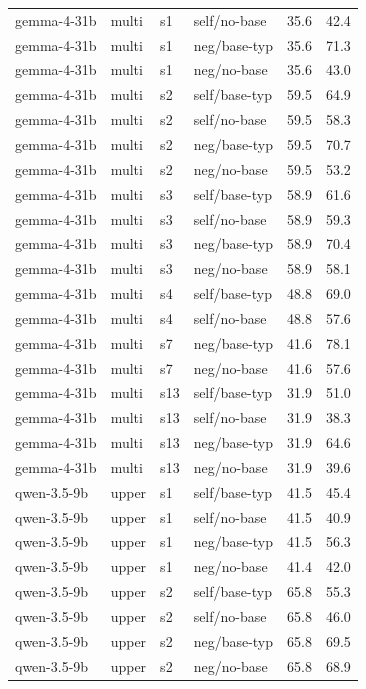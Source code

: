 {\begin{longtable}{llll rr}
gemma-4-31b & multi & s1 & self/no-base & 35.6 & 42.4 \\
gemma-4-31b & multi & s1 & neg/base-typ & 35.6 & 71.3 \\
gemma-4-31b & multi & s1 & neg/no-base & 35.6 & 43.0 \\
gemma-4-31b & multi & s2 & self/base-typ & 59.5 & 64.9 \\
gemma-4-31b & multi & s2 & self/no-base & 59.5 & 58.3 \\
gemma-4-31b & multi & s2 & neg/base-typ & 59.5 & 70.7 \\
gemma-4-31b & multi & s2 & neg/no-base & 59.5 & 53.2 \\
gemma-4-31b & multi & s3 & self/base-typ & 58.9 & 61.6 \\
gemma-4-31b & multi & s3 & self/no-base & 58.9 & 59.3 \\
gemma-4-31b & multi & s3 & neg/base-typ & 58.9 & 70.4 \\
gemma-4-31b & multi & s3 & neg/no-base & 58.9 & 58.1 \\
gemma-4-31b & multi & s4 & self/base-typ & 48.8 & 69.0 \\
gemma-4-31b & multi & s4 & self/no-base & 48.8 & 57.6 \\
gemma-4-31b & multi & s7 & neg/base-typ & 41.6 & 78.1 \\
gemma-4-31b & multi & s7 & neg/no-base & 41.6 & 57.6 \\
gemma-4-31b & multi & s13 & self/base-typ & 31.9 & 51.0 \\
gemma-4-31b & multi & s13 & self/no-base & 31.9 & 38.3 \\
gemma-4-31b & multi & s13 & neg/base-typ & 31.9 & 64.6 \\
gemma-4-31b & multi & s13 & neg/no-base & 31.9 & 39.6 \\
\midrule
qwen-3.5-9b & upper & s1 & self/base-typ & 41.5 & 45.4 \\
qwen-3.5-9b & upper & s1 & self/no-base & 41.5 & 40.9 \\
qwen-3.5-9b & upper & s1 & neg/base-typ & 41.5 & 56.3 \\
qwen-3.5-9b & upper & s1 & neg/no-base & 41.4 & 42.0 \\
qwen-3.5-9b & upper & s2 & self/base-typ & 65.8 & 55.3 \\
qwen-3.5-9b & upper & s2 & self/no-base & 65.8 & 46.0 \\
qwen-3.5-9b & upper & s2 & neg/base-typ & 65.8 & 69.5 \\
qwen-3.5-9b & upper & s2 & neg/no-base & 65.8 & 68.9 \\

\end{longtable}}

